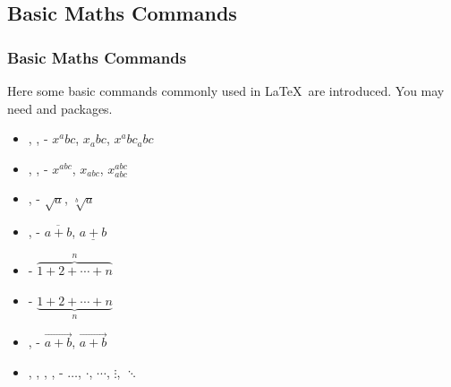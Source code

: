\subsection{Basic Maths Commands}

\begin{frame}
	\frametitle{Basic Maths Commands}
	Here some basic commands commonly used in \LaTeX\ are introduced. You may need  and   packages.
	\begin{itemize}
		\item {}, ,  - $x^abc$, $x_abc$, $x^abc_abc$
		\item {}, ,  - $x^{abc}$, $x_{abc}$, $x^{abc}_{abc}$
		\item {},  - $\sqrt{a}$, $\sqrt[b]{a}$
		\item {},  - $\overline{a+b}$, $\underline{a+b}$
		\item {} - $\overbrace{1+2+\cdots+n}^n$
		\item {} - $\underbrace{1+2+\cdots+n}_n$
		\item {},  - $\overrightarrow{a+b}$, $\vec{a+b}$
		\item {}, , , ,  - $\dots$, $\cdot$, $\cdots$, $\vdots$, $\ddots$
	\end{itemize}
\end{frame}

